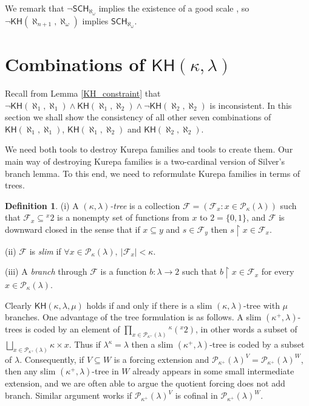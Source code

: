 \documentclass[10pt,reqno]{amsart}
\theoremstyle{plain}
\theoremstyle{definition}
\newtheorem{definition}[theorem]{Definition}
\theoremstyle{remark}
\begin{document}
We remark that $\lnot\mathsf{SCH}_{\aleph_{\omega}}$ implies the existence of a good scale \cite[Theorem 19.3]{cummings_notes}, so $\lnot\mathsf{KH}(\aleph_{n+1},\aleph_\omega)$ implies $\mathsf{SCH}_{\aleph_{\omega}}$.







\section{Combinations of $\mathsf{KH}(\kappa,\lambda)$}

Recall from Lemma \ref{KH_constraint} that $\lnot\mathsf{KH}(\aleph_1,\aleph_1)\land\mathsf{KH}(\aleph_1,\aleph_2)\land\lnot\mathsf{KH}(\aleph_2,\aleph_2)$ is inconsistent. In this section we shall show the consistency of all other seven combinations of $\mathsf{KH}(\aleph_1,\aleph_1)$, $\mathsf{KH}(\aleph_1,\aleph_2)$ and $\mathsf{KH}(\aleph_2,\aleph_2)$. 

We need both tools to destroy Kurepa families and tools to create them. Our main way of destroying Kurepa families is a two-cardinal version of Silver's branch lemma. To this end, we need to reformulate Kurepa families in terms of trees.

\begin{definition}
(i) A \textit{$(\kappa,\lambda)$-tree} is a collection $\mathcal{F}=(\mathcal{F}_x:x\in\mathcal{P}_\kappa(\lambda))$ such that $\mathcal{F}_x\subseteq{}^x2$ is a nonempty set of functions from $x$ to $2=\{0,1\}$, and $\mathcal{F}$ is downward closed in the sense that if $x\subseteq y$ and $s\in\mathcal{F}_y$ then $s\upharpoonright x\in\mathcal{F}_x$.

(ii) $\mathcal{F}$ is \textit{slim} if $\forall x\in\mathcal{P}_\kappa(\lambda),\ |\mathcal{F}_x|<\kappa$.

(iii) A \textit{branch} through $\mathcal{F}$ is a function $b:\lambda\rightarrow 2$ such that $b\upharpoonright x\in\mathcal{F}_x$ for every $x\in\mathcal{P}_\kappa(\lambda)$.
\end{definition}

Clearly $\mathsf{KH}(\kappa,\lambda,\mu)$ holds if and only if there is a slim $(\kappa,\lambda)$-tree with $\mu$ branches. One advantage of the tree formulation is as follows. A slim $(\kappa^+,\lambda)$-trees is coded by an element of $\prod_{x\in\mathcal{P}_{\kappa^+}(\lambda)}{}^\kappa({}^x2)$, in other words a subset of $\bigsqcup_{x\in\mathcal{P}_{\kappa^+}(\lambda)}\kappa\times x$. Thus if $\lambda^\kappa=\lambda$ then a slim $(\kappa^+,\lambda)$-tree is coded by a subset of $\lambda$. Consequently, if $V\subseteq W$ is a forcing extension and $\mathcal{P}_{\kappa^+}(\lambda)^V=\mathcal{P}_{\kappa^+}(\lambda)^W$, then any slim $(\kappa^+,\lambda)$-tree in $W$ already appears in some small intermediate extension, and we are often able to argue the quotient forcing does not add branch. Similar argument works if $\mathcal{P}_{\kappa^+}(\lambda)^V$ is cofinal in $\mathcal{P}_{\kappa^+}(\lambda)^W$.
\end{document}
